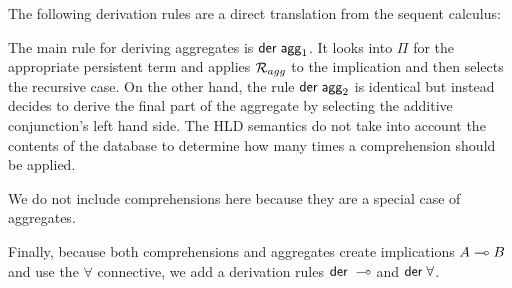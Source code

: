The following derivation rules are a direct translation from the sequent
calculus:



The main rule for deriving aggregates is $\mathsf{der} \; \mathsf{agg}_1$. It looks into
$\Pi$ for the appropriate persistent term and applies $\mathcal{R}_{agg}$ to the
implication and then selects the recursive case. On the other hand, the rule
$\mathsf{der} \; \mathsf{agg}_2$ is identical but instead decides to derive the final part of
the aggregate by selecting the additive conjunction's left hand side. The HLD
semantics do not take into account the contents of the database to determine how
many times a comprehension should be applied.



We do not include comprehensions here because they are a special case of
aggregates.

Finally, because both comprehensions and aggregates create implications $A \multimap
B$ and use the $\forall$ connective, we add a derivation rules $\mathsf{der} \; \multimap$
and $\mathsf{der} \; \forall$.


